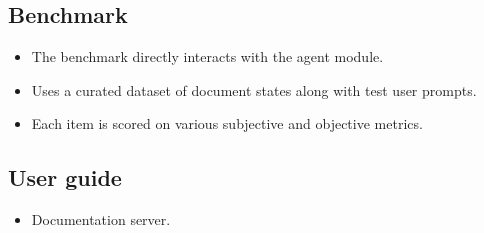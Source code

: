 \subsection{Benchmark}

\begin{itemize}
    \item The benchmark directly interacts with the agent module.
    \item Uses a curated dataset of document states along with test user prompts.
    \item Each item is scored on various subjective and objective metrics.
\end{itemize}

\subsection{User guide}

\begin{itemize}
    \item Documentation server.
\end{itemize}
